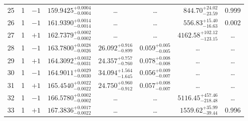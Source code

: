 \begin{table*}[!]
\begin{tabular}{llcrrlrc}
25  & 1 & $-1$ & $    159.9425_{-      0.0004}^{+      0.0004}$ & \multicolumn{1}{c}{\dots} & \multicolumn{1}{c}{\dots} & $      844.70_{-       23.59}^{+       24.02}$ & 0.999\\[1pt]
26 & 1 & $-1$ & $    161.9390_{-      0.0014}^{+      0.0014}$ & \multicolumn{1}{c}{\dots} & \multicolumn{1}{c}{\dots} & $      556.83_{-       16.63}^{+       15.40}$ & 0.002\\[1pt]
27 & 1 & $+1$ & $    162.7379_{-      0.0002}^{+      0.0002}$ & \multicolumn{1}{c}{\dots} & \multicolumn{1}{c}{\dots} & $     4162.58_{-      123.15}^{+      102.12}$ & \dots \\[1pt]
28 & 1 & $-1$ & $    163.7800_{-      0.0026}^{+      0.0028}$ & $      26.092_{-       0.899}^{+       0.916}$ & $       0.059_{-       0.005}^{+       0.005}$ & \multicolumn{1}{c}{\dots} & \dots \\[1pt]
29 & 1 & $+1$ & $    164.3092_{-      0.0031}^{+      0.0032}$ & $      24.357_{-       0.760}^{+       0.757}$ & $       0.078_{-       0.008}^{+       0.008}$ & \multicolumn{1}{c}{\dots} & \dots \\[1pt]
30 & 1 & $-1$ & $    164.9011_{-      0.0030}^{+      0.0029}$ & $      34.094_{-       1.645}^{+       1.564}$ & $       0.056_{-       0.007}^{+       0.009}$ & \multicolumn{1}{c}{\dots} & \dots \\[1pt]
31 & 1 & $+1$ & $    165.4540_{-      0.0022}^{+      0.0022}$ & $      24.750_{-       0.912}^{+       0.960}$ & $       0.057_{-       0.007}^{+       0.008}$ & \multicolumn{1}{c}{\dots} & \dots \\[1pt]
32 & 1 & $-1$ & $    166.5780_{-      0.0002}^{+      0.0002}$ & \multicolumn{1}{c}{\dots} & \multicolumn{1}{c}{\dots} & $     5116.45_{-      218.48}^{+      457.46}$ & \dots \\[1pt]
33 & 1 & $+1$ & $    167.3836_{-      0.0022}^{+      0.0017}$ & \multicolumn{1}{c}{\dots} & \multicolumn{1}{c}{\dots} & $     1559.62_{-       39.44}^{+       35.99}$ & 0.996\\[1pt]
 

\end{tabular}
\end{table*}
